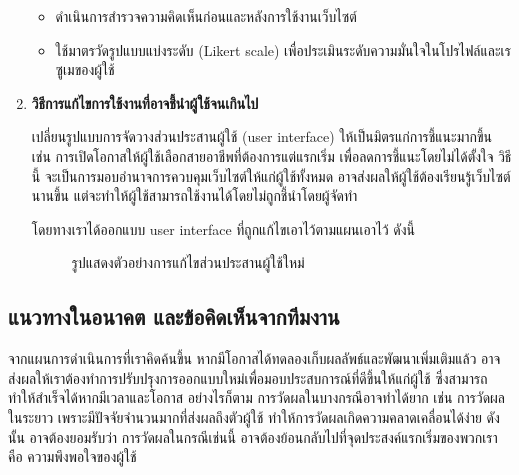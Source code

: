 \begin{enumerate}
    \begin{itemize}
        \item ดำเนินการสำรวจความคิดเห็นก่อนและหลังการใช้งานเว็บไซต์
        \item ใช้มาตรวัดรูปแบบแบ่งระดับ (Likert scale) เพื่อประเมินระดับความมั่นใจในโปรไฟล์และเรซูเมของผู้ใช้
    \end{itemize}

    \item \textbf{วิธีการแก้ไขการใช้งานที่อาจชี้นำผู้ใช้จนเกินไป}
    
    \par{
        เปลี่ยนรูปแบบการจัดวางส่วนประสานผู้ใช้ (user interface) ให้เป็นมิตรแก่การชี้แนะมากขึ้น เช่น การเปิดโอกาสให้ผู้ใช้เลือกสายอาชีพที่ต้องการแต่แรกเริ่ม เพื่อลดการชี้แนะโดยไม่ได้ตั้งใจ วิธีนี้ จะเป็นการมอบอำนาจการควบคุมเว็บไซต์ให้แก่ผู้ใช้ทั้งหมด อาจส่งผลให้ผู้ใช้ต้องเรียนรู้เว็บไซต์นานขึ้น แต่จะทำให้ผู้ใช้สามารถใช้งานได้โดยไม่ถูกชี้นำโดยผู้จัดทำ
    }

    โดยทางเราได้ออกแบบ user interface ที่ถูกแก้ไขเอาไว้ตามแผนเอาไว้ ดังนี้

    \begin{figure}[H]\centering
        \caption{รูปแสดงตัวอย่างการแก้ไขส่วนประสานผู้ใช้ใหม่}\label{fig:new-ui}
    \end{figure}

\end{enumerate}


\subsection{แนวทางในอนาคต และข้อคิดเห็นจากทีมงาน}

\par{
    จากแผนการดำเนินการที่เราคิดค้นขึ้น หากมีโอกาสได้ทดลองเก็บผลลัพธ์และพัฒนาเพิ่มเติมแล้ว อาจส่งผลให้เราต้องทำการปรับปรุงการออกแบบใหม่เพื่อมอบประสบการณ์ที่ดีขึ้นให้แก่ผู้ใช้ ซึ่งสามารถทำให้สำเร็จได้หากมีเวลาและโอกาส อย่างไรก็ตาม การวัดผลในบางกรณีอาจทำได้ยาก เช่น การวัดผลในระยาว เพราะมีปัจจัยจำนวนมากที่ส่งผลถึงตัวผู้ใช้ ทำให้การวัดผลเกิดความคลาดเคลื่อนได้ง่าย ดังนั้น อาจต้องยอมรับว่า การวัดผลในกรณีเช่นนี้ อาจต้องย้อนกลับไปที่จุดประสงค์แรกเริ่มของพวกเรา คือ ความพึงพอใจของผู้ใช้
}